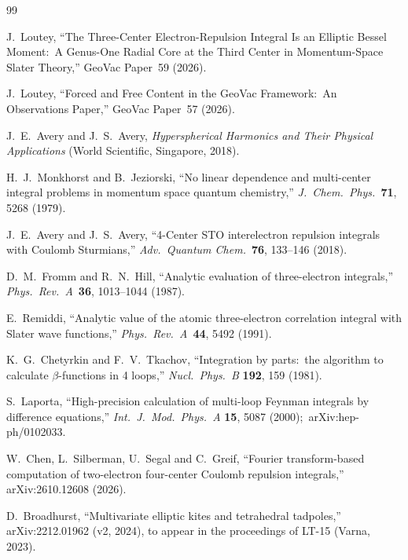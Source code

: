 \documentclass[aps,pra,twocolumn,superscriptaddress,longbibliography]{revtex4-2}
\begin{document}
\begin{thebibliography}{99}

J.~Loutey, ``The Three-Center Electron-Repulsion Integral Is an Elliptic
Bessel Moment:\ A Genus-One Radial Core at the Third Center in Momentum-Space
Slater Theory,'' GeoVac Paper~59 (2026).

J.~Loutey, ``Forced and Free Content in the GeoVac Framework:\ An
Observations Paper,'' GeoVac Paper~57 (2026).

J.~E.~Avery and J.~S.~Avery, \textit{Hyperspherical Harmonics and Their
Physical Applications} (World Scientific, Singapore, 2018).

H.~J.~Monkhorst and B.~Jeziorski, ``No linear dependence and multi-center
integral problems in momentum space quantum chemistry,'' \textit{J.\ Chem.\
Phys.}\ \textbf{71}, 5268 (1979).


J.~E.~Avery and J.~S.~Avery, ``4-Center STO interelectron repulsion
integrals with Coulomb Sturmians,'' \textit{Adv.\ Quantum Chem.}\ \textbf{76},
133--146 (2018).

D.~M.~Fromm and R.~N.~Hill, ``Analytic evaluation of three-electron
integrals,'' \textit{Phys.\ Rev.\ A}\ \textbf{36}, 1013--1044 (1987).

E.~Remiddi, ``Analytic value of the atomic three-electron correlation
integral with Slater wave functions,'' \textit{Phys.\ Rev.\ A}\ \textbf{44},
5492 (1991).

K.~G.~Chetyrkin and F.~V.~Tkachov, ``Integration by parts:\ the algorithm
to calculate $\beta$-functions in 4 loops,'' \textit{Nucl.\ Phys.\ B}
\textbf{192}, 159 (1981).

S.~Laporta, ``High-precision calculation of multi-loop Feynman integrals by
difference equations,'' \textit{Int.\ J.\ Mod.\ Phys.\ A} \textbf{15}, 5087
(2000);\ arXiv:hep-ph/0102033.

W.~Chen, L.~Silberman, U.~Segal and C.~Greif, ``Fourier transform-based
computation of two-electron four-center Coulomb repulsion integrals,''
arXiv:2610.12608 (2026).

D.~Broadhurst, ``Multivariate elliptic kites and tetrahedral tadpoles,''
arXiv:2212.01962 (v2, 2024), to appear in the proceedings of LT-15 (Varna,
2023).


\end{thebibliography}
\end{document}
